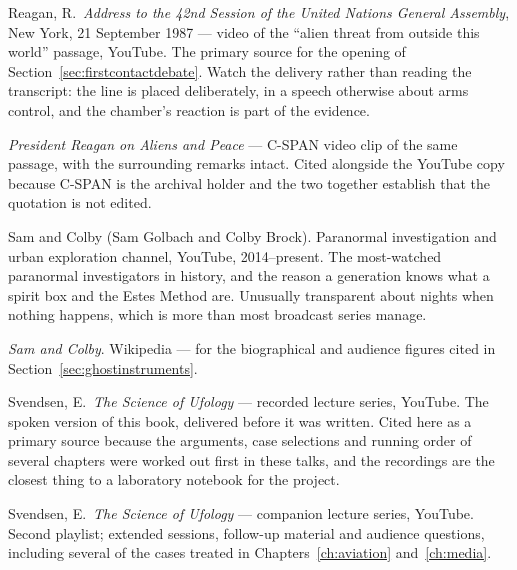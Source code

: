 \begin{list}{}{\setlength{\leftmargin}{1.2em}\setlength{\itemindent}{-1.2em}
\setlength{\itemsep}{3pt}}
\item Reagan, R.\ \emph{Address to the 42nd Session of the United Nations General Assembly}, New
York, 21 September 1987 --- video of the ``alien threat from outside this world'' passage, YouTube.
The primary source for the opening of Section~\ref{sec:firstcontactdebate}. Watch the delivery
rather than reading the transcript: the line is placed deliberately, in a speech otherwise about
arms control, and the chamber's reaction is part of the evidence.
\item \emph{President Reagan on Aliens and Peace} --- C-SPAN video clip of the same passage, with
the surrounding remarks intact. Cited alongside the YouTube copy because C-SPAN is the archival
holder and the two together establish that the quotation is not edited.
\item Sam and Colby (Sam Golbach and Colby Brock). Paranormal investigation and urban exploration
channel, YouTube, 2014--present. The most-watched paranormal investigators in history, and the
reason a generation knows what a spirit box and the Estes Method are. Unusually transparent about
nights when nothing happens, which is more than most broadcast series manage.
\item \emph{Sam and Colby}. Wikipedia --- for the biographical and audience figures cited in
Section~\ref{sec:ghostinstruments}.
\item Svendsen, E.\ \emph{The Science of Ufology} --- recorded lecture series, YouTube. The spoken
version of this book, delivered before it was written. Cited here as a primary source because the
arguments, case selections and running order of several chapters were worked out first in these
talks, and the recordings are the closest thing to a laboratory notebook for the project.
\item Svendsen, E.\ \emph{The Science of Ufology} --- companion lecture series, YouTube. Second
playlist; extended sessions, follow-up material and audience questions, including several of the
cases treated in Chapters~\ref{ch:aviation} and~\ref{ch:media}.

\end{list}
